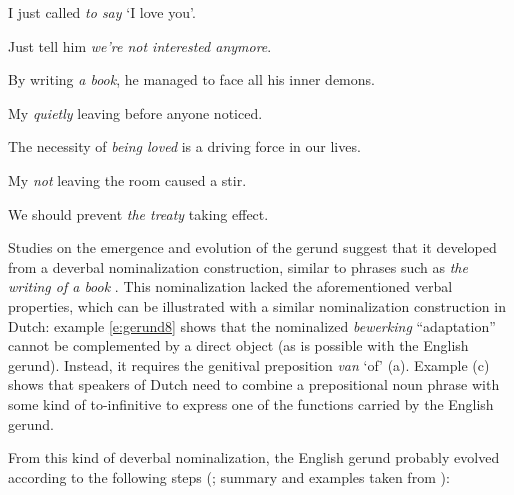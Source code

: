 \ea
\label{e:gerund1}
I just called \emph{to say} `I love you'.
\item Just tell him \emph{we're not interested anymore}.
\label{e:gerund2}
\item By writing \emph{a book}, he managed to face all his inner demons.
\label{e:gerund3}
\item My \emph{quietly} leaving before anyone noticed.
\label{e:gerund4}
\item The necessity of \emph{being loved} is a driving force in our lives.
\label{e:gerund5}
\item My \emph{not} leaving the room caused a stir.
\label{e:gerund6}
\item We should prevent \emph{the treaty} taking effect.
\label{e:gerund7}
\z

Studies on the emergence and evolution of the gerund suggest that it developed from a deverbal nominalization construction, similar to phrases such as \emph{the writing of a book} \citep{tajima85syntactic}. This nominalization lacked the aforementioned verbal properties, which can be illustrated with a similar nominalization construction in Dutch: example \ref{e:gerund8} shows that the nominalized \emph{bewerking} ``adaptation'' cannot be complemented by a direct object (as is possible with the English gerund). Instead, it requires the genitival preposition \emph{van} `of' (a). Example (c) shows that speakers of Dutch need to combine a prepositional noun phrase with some kind of  to-infinitive to express one of the functions carried by the English gerund.

\eal
\label{e:gerund8}
\zl

From this kind of deverbal nominalization, the English gerund probably evolved according to the following steps (\citealp{tajima85syntactic}; summary and examples taken from \citealp{fanego04reanalysis}):

